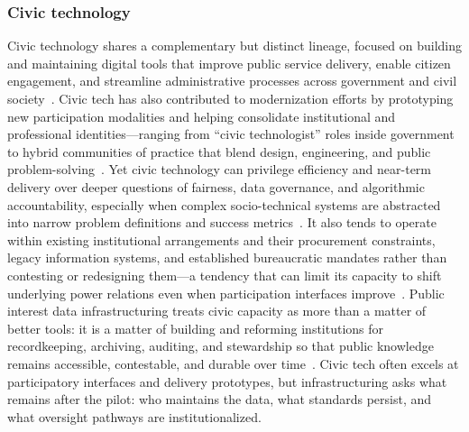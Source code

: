 \documentclass[acmsmall,screen]{acmart}
\begin{document}
\subsubsection*{Civic technology}
Civic technology shares a complementary but distinct lineage, focused on building and maintaining digital tools that improve public service delivery, enable citizen engagement, and streamline administrative processes across government and civil society~\cite{boehnerDataDesignCivics2016,aragonCivicTechnologiesResearch2020,ruijerConnectingSocietalIssues2017}. Civic tech has also contributed to modernization efforts by prototyping new participation modalities and helping consolidate institutional and professional identities---ranging from ``civic technologist'' roles inside government to hybrid communities of practice that blend design, engineering, and public problem-solving~\cite{aragonCivicTechnologiesResearch2020,matias_civic_2019,riderBuildingIdealWorkplaces2022}. Yet civic technology can privilege efficiency and near-term delivery over deeper questions of fairness, data governance, and algorithmic accountability, especially when complex socio-technical systems are abstracted into narrow problem definitions and success metrics~\cite{selbst2019fairness,hutchinsonAccountabilityMachineLearning2021,paakkonenBureaucracyLensAnalyzing2020b}. It also tends to operate within existing institutional arrangements and their procurement constraints, legacy information systems, and established bureaucratic mandates rather than contesting or redesigning them---a tendency that can limit its capacity to shift underlying power relations even when participation interfaces improve~\cite{kimDigitalGovernmentWicked2016,gil-garciaDigitalGovernmentPublic2018,ruijerConnectingSocietalIssues2017}. Public interest data infrastructuring treats civic capacity as more than a matter of better tools: it is a matter of building and reforming institutions for recordkeeping, archiving, auditing, and stewardship so that public knowledge remains accessible, contestable, and durable over time~\cite{acker_DataCraftTheory_2019,schwartz_archives_2002,hutchinsonAccountabilityMachineLearning2021}. Civic tech often excels at participatory interfaces and delivery prototypes, but infrastructuring asks what remains after the pilot: who maintains the data, what standards persist, and what oversight pathways are institutionalized.
\end{document}
